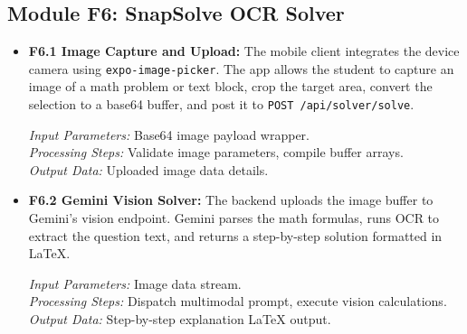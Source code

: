\documentclass[12,Times new Roman,a4paper]{report}
\begin{document}
\subsection{Module F6: SnapSolve OCR Solver}
\begin{itemize}
    \item \textbf{F6.1 Image Capture and Upload:} The mobile client integrates the device camera using \texttt{expo-image-picker}. The app allows the student to capture an image of a math problem or text block, crop the target area, convert the selection to a base64 buffer, and post it to \texttt{POST /api/solver/solve}.
    
    \textit{Input Parameters:} Base64 image payload wrapper. \\
    \textit{Processing Steps:} Validate image parameters, compile buffer arrays. \\
    \textit{Output Data:} Uploaded image data details.
    
    \item \textbf{F6.2 Gemini Vision Solver:} The backend uploads the image buffer to Gemini's vision endpoint. Gemini parses the math formulas, runs OCR to extract the question text, and returns a step-by-step solution formatted in LaTeX.
    
    \textit{Input Parameters:} Image data stream. \\
    \textit{Processing Steps:} Dispatch multimodal prompt, execute vision calculations. \\
    \textit{Output Data:} Step-by-step explanation LaTeX output.
\end{itemize}
\end{document}
